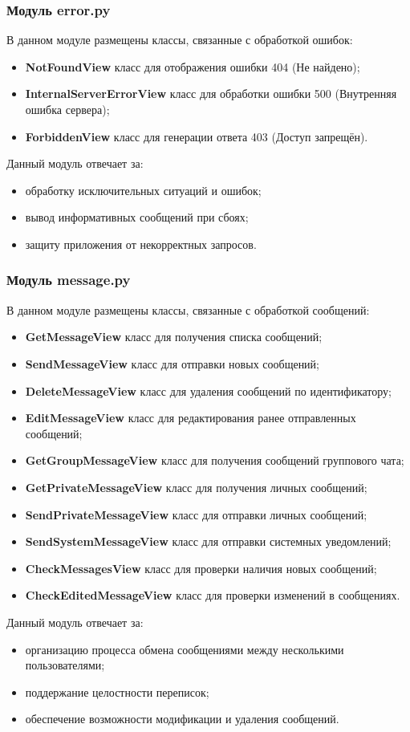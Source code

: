 \subsubsection{Модуль error.py}
В данном модуле размещены классы, связанные с обработкой ошибок:
\begin{itemize}
	\item \textbf{NotFoundView} класс для отображения ошибки 404 (Не найдено);
	\item \textbf{InternalServerErrorView} класс для обработки ошибки 500 (Внутренняя ошибка сервера);
	\item \textbf{ForbiddenView} класс для генерации ответа 403 (Доступ запрещён).
\end{itemize}
Данный модуль отвечает за:
\begin{itemize}
	\item обработку исключительных ситуаций и ошибок;
	\item вывод информативных сообщений при сбоях;
	\item защиту приложения от некорректных запросов.
\end{itemize}

\subsubsection{Модуль message.py}
В данном модуле размещены классы, связанные с обработкой сообщений:
\begin{itemize}
	\item \textbf{GetMessageView} класс для получения списка сообщений;
	\item \textbf{SendMessageView} класс для отправки новых сообщений;
	\item \textbf{DeleteMessageView} класс для удаления сообщений по идентификатору;
	\item \textbf{EditMessageView} класс для редактирования ранее отправленных сообщений;
	\item \textbf{GetGroupMessageView} класс для получения сообщений группового чата;
	\item \textbf{GetPrivateMessageView} класс для получения личных сообщений;
	\item \textbf{SendPrivateMessageView} класс для отправки личных сообщений;
	\item \textbf{SendSystemMessageView} класс для отправки системных уведомлений;
	\item \textbf{CheckMessagesView} класс для проверки наличия новых сообщений;
	\item \textbf{CheckEditedMessageView} класс для проверки изменений в сообщениях.
\end{itemize}
Данный модуль отвечает за:
\begin{itemize}
	\item организацию процесса обмена сообщениями между несколькими пользователями;
	\item поддержание целостности переписок;
	\item обеспечение возможности модификации и удаления сообщений.
\end{itemize}

